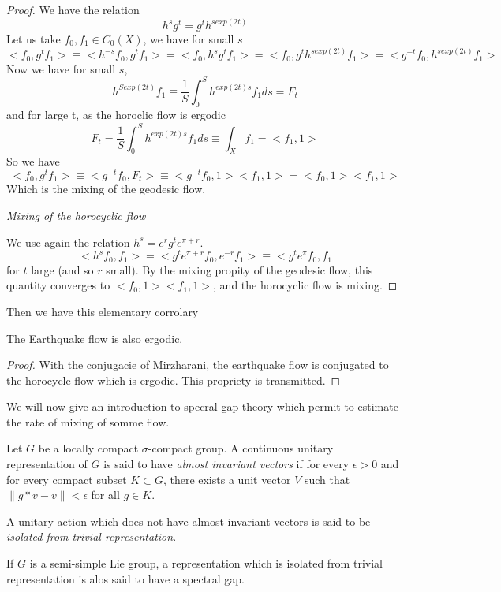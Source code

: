 \begin{proof}
We have the relation \[
h^s g^t =g^t h^{s exp(2t)}
\]
Let us take $f_0,f_1 \in C_0(X)$,
we have for small $s$ %
\[
<f_0,g^t f_1 > \equiv <h^{-s} f_0,g^t f_1 >=<f_0 , h^s g^t f_1 >
= <f_0 , g^t h^{s exp(2t)} f_1 > = <g^{-t} f_0 , h^{s exp(2t)}f_1>
\]
Now we have for small $s$, \[
h^{S exp(2t)}f_1 \equiv \frac{1}{S} \int_0^S h^{exp(2t)s} f_1 ds =F_t
\]
and for large t, as the horoclic flow is ergodic \[
F_t = \frac{1}{S} \int_0^S h^{exp(2t)s} f_1 ds \equiv \int_X f_1 = <f_1 , 1 >
\]
So we have \[
<f_0, g^t f_1 > \equiv <g^{-t} f_0, F_t > \equiv <g^{-t} f_0 ,1 ><f_1,1> = <f_0,1><f_1,1>
\]
Which is the mixing of the geodesic flow.

\emph{Mixing of the horocyclic flow}

We use again the relation $h^s = e^r g^t e^{\pi + r}$. \[
<h^s f_0 , f_1 > = < g^t  e^{\pi+r} f_0, e^{-r} f_1> \equiv <g^t e^{\pi} f_0, f_1
\]
for $t$ large (and so $r$ small). By the mixing propity of the geodesic flow, this quantity converges to $<f_0,1><f_1,1>$, and the horocyclic flow is mixing.

\end{proof}


Then we have this elementary corrolary

\begin{cor}
The Earthquake flow is also ergodic.
\end{cor}

\begin{proof}
With the conjugacie of Mirzharani, the earthquake flow is conjugated to the horocycle flow which is ergodic. This propriety is transmitted.
\end{proof}

We will now give an introduction to specral gap theory which permit to estimate the rate of mixing of somme flow.

\begin{dfnt}
Let $G$ be a locally compact $\sigma$-compact group. A continuous unitary
 representation of $G$ is said to have \emph{almost invariant vectors}
 if for every $\epsilon > 0$ and for every compact subset $K \subset G$, there exists a unit vector $V$ such that $\|g*v-v\| < \epsilon$ for all $g \in K$.

 A unitary action which does not have almost invariant vectors is said to be \emph{isolated from trivial representation}.

 If $G$ is a semi-simple Lie group, a representation which is isolated from trivial representation is alos said to have a spectral gap.
\end{dfnt}

